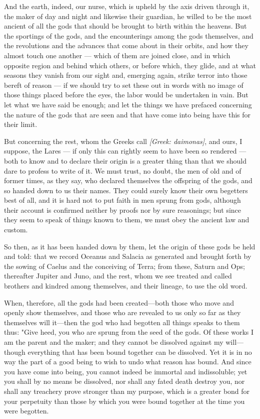  And the earth, indeed, our nurse, which is upheld by the axis driven through it, the maker of day and night and likewise their guardian, he willed to be the most ancient of all the gods that should be brought to birth within the heavens. But the sportings of the gods, and the encounterings among the gods themselves, and the revolutions and the advances that come about in their orbits, and how they almost touch one another — which of them are joined close, and in which opposite region and behind which others, or before which, they glide, and at what seasons they vanish from our sight and, emerging again, strike terror into those bereft of reason — if we should try to set these out in words with no image of those things placed before the eyes, the labor would be undertaken in vain. But let what we have said be enough; and let the things we have prefaced concerning the nature of the gods that are seen and that have come into being have this for their limit.

 But concerning the rest, whom the Greeks call \textit{[Greek: daimonas]}, and ours, I suppose, the Lares — if only this can rightly seem to have been so rendered — both to know and to declare their origin is a greater thing than that we should dare to profess to write of it. We must trust, no doubt, the men of old and of former times, as they say, who declared themselves the offspring of the gods, and so handed down to us their names. They could surely know their own begetters best of all, and it is hard not to put faith in men sprung from gods, although their account is confirmed neither by proofs nor by sure reasonings; but since they seem to speak of things known to them, we must obey the ancient law and custom.

 So then, as it has been handed down by them, let the origin of these gods be held and told: that we record Oceanus and Salacia as generated and brought forth by the sowing of Caelus and the conceiving of Terra; from these, Saturn and Ops; thereafter Jupiter and Juno, and the rest, whom we see treated and called brothers and kindred among themselves, and their lineage, to use the old word.

 When, therefore, all the gods had been created—both those who move and openly show themselves, and those who are revealed to us only so far as they themselves will it—then the god who had begotten all things speaks to them thus: "Give heed, you who are sprung from the seed of the gods. Of these works I am the parent and the maker; and they cannot be dissolved against my will—though everything that has been bound together can be dissolved. Yet it is in no way the part of a good being to wish to undo what reason has bound. And since you have come into being, you cannot indeed be immortal and indissoluble; yet you shall by no means be dissolved, nor shall any fated death destroy you, nor shall any treachery prove stronger than my purpose, which is a greater bond for your perpetuity than those by which you were bound together at the time you were begotten.

